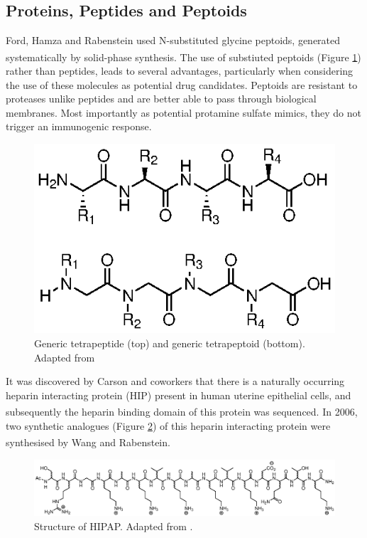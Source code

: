 \subsection{Proteins, Peptides and Peptoids}
Ford, Hamza and Rabenstein used N-substituted glycine peptoids, generated systematically by solid-phase synthesis.\textsuperscript{\cite{Ford2013DesignPeptoids}} The use of substiuted peptoids (Figure \ref{peptide_vs_peptoid}) rather than peptides, leads to several advantages, particularly when considering the use of these molecules as potential drug candidates. Peptoids are resistant to proteases unlike peptides and are better able to pass through biological membranes. Most importantly as potential protamine sulfate mimics, they do not trigger an immunogenic response. 
\begin{figure} [ht!]
\centering
\includegraphics{Figures/peptide_vs_peptoid.eps}
\caption{Generic tetrapeptide (top) and generic tetrapeptoid (bottom). Adapted from \cite{Ford2013DesignPeptoids}}
\label{peptide_vs_peptoid}
\end{figure}

It was discovered by Carson and coworkers that there is a naturally occurring heparin interacting protein (HIP) present in human uterine epithelial cells, and subsequently the heparin binding domain of this protein was sequenced.\textsuperscript{\cite{Rohde1996CellLines.,Liu1996CDNALines.}} 
In 2006, two synthetic analogues (Figure \ref{HIPAP_structure}) of this heparin interacting protein were synthesised by Wang and Rabenstein.\textsuperscript{\cite{Wang2006Interactionsup/sup}}

\begin{figure} [h!]
\centering
\includegraphics[scale=0.85]{Figures/HIPAP_structure.eps}
\caption{Structure of HIPAP. Adapted from \cite{Wang2006Interactionsup/sup}.}
\label{HIPAP_structure}
\end{figure}


